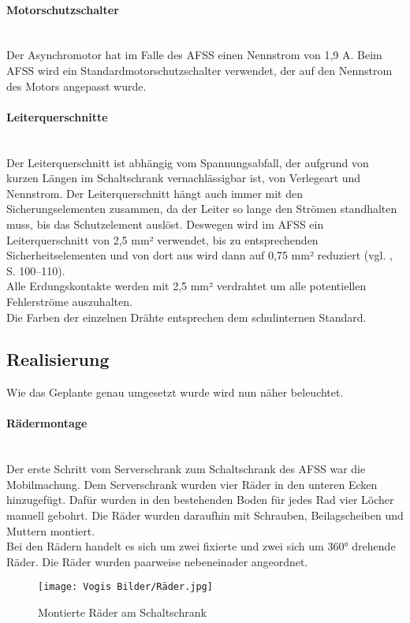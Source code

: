     \paragraph{Motorschutzschalter}\mbox{}\\
    Der Asynchromotor hat im Falle des AFSS einen Nennstrom von 1,9 A. Beim AFSS wird ein Standardmotorschutzschalter verwendet, der auf den Nennstrom des Motors angepasst wurde. 
    \paragraph{Leiterquerschnitte}\mbox{}\\
    Der Leiterquerschnitt ist abhängig vom Spannungsabfall, der aufgrund von kurzen Längen im Schaltschrank vernachlässigbar ist, von Verlegeart und Nennstrom. Der Leiterquerschnitt hängt auch immer mit den Sicherungselementen zusammen, da der Leiter so lange den Strömen standhalten muss, bis das Schutzelement auslöst. Deswegen wird im AFSS ein Leiterquerschnitt von 2,5 mm² verwendet, bis zu entsprechenden Sicherheitselementen und von dort aus wird dann auf 0,75 mm² reduziert (vgl. \cite{SeyrRösch}, S. 100–110).\\ 
    Alle Erdungskontakte werden mit 2,5 mm² verdrahtet um alle potentiellen Fehlerströme auszuhalten.\\
    Die Farben der einzelnen Drähte entsprechen dem schulinternen Standard.
\subsection{Realisierung}
    Wie das Geplante genau umgesetzt wurde wird nun näher beleuchtet.
    \paragraph{Rädermontage}\mbox{}\\
    Der erste Schritt vom Serverschrank zum Schaltschrank des AFSS war die Mobilmachung. Dem Serverschrank wurden vier Räder in den unteren Ecken hinzugefügt. Dafür wurden in den bestehenden Boden für jedes Rad vier Löcher manuell gebohrt. Die Räder wurden daraufhin mit Schrauben, Beilagscheiben und Muttern montiert.\\
    Bei den Rädern handelt es sich um zwei fixierte und zwei sich um 360° drehende Räder. Die Räder wurden paarweise nebeneinader angeordnet.
    \begin{figure}[h]
        \centering
        \texttt{[image: Vogis Bilder/Räder.jpg]}
        \caption{Montierte Räder am Schaltschrank}
        \label{fig:Raeder_montiert}
    \end{figure}
